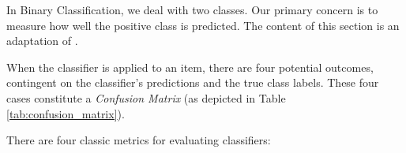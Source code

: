 \label{appendix00:metrics}


In Binary Classification, we deal with two classes. Our primary concern is to measure how well the positive class is predicted.
The content of this section is an adaptation of .


When the classifier is applied to an item, there are four potential outcomes, contingent on the classifier's predictions and the true class labels. These four cases constitute a \emph{Confusion Matrix} (as depicted in Table \ref{tab:confusion_matrix}).





\begin{table}[ht]
\centering
{}
\caption{Classification Outcomes}
\label{tab:02_classification_outcomes}
\end{table}



There are four classic metrics for evaluating classifiers:

